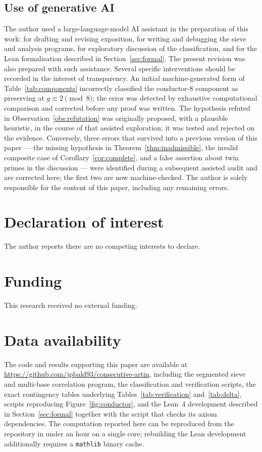 \documentclass[11pt,reqno]{amsart}
\theoremstyle{plain}
\theoremstyle{definition}
\begin{document}
\subsection*{Use of generative AI}
The author used a large-language-model AI assistant in the preparation of this
work: for drafting and revising exposition, for writing and debugging the
sieve and analysis programs, for exploratory discussion of the
classification, and for the Lean formalisation described in
Section~\ref{sec:formal}. The present revision was also prepared with such
assistance. Several specific interventions should be recorded in the interest
of transparency. An initial machine-generated form of
Table~\ref{tab:components} incorrectly classified the conductor-$8$ component
as preserving at $g \equiv 2 \pmod 8$; the error was detected by exhaustive
computational comparison and corrected before any proof was written. The
hypothesis refuted in Observation~\ref{obs:refutation} was originally
proposed, with a plausible heuristic, in the course of that assisted
exploration; it was tested and rejected on the evidence. Conversely, three
errors that survived into a previous version of this paper --- the missing
hypothesis in Theorem~\ref{thm:inadmissible}, the invalid composite case of
Corollary~\ref{cor:complete}, and a false assertion about twin primes in the
discussion --- were identified during a subsequent assisted audit and are
corrected here; the first two are now machine-checked. The author is solely
responsible for the content of this paper, including any remaining errors.

\section*{Declaration of interest}
The author reports there are no competing interests to declare.

\section*{Funding}
This research received no external funding.

\section*{Data availability}
The code and results supporting this paper are available at
\url{https://github.com/jpbald93/consecutive-artin}, including the segmented
sieve and multi-base correlation program, the classification and verification
scripts, the exact contingency tables underlying
Tables~\ref{tab:verification} and~\ref{tab:delta}, scripts reproducing
Figure~\ref{fig:conductor}, and the Lean~4 development described in
Section~\ref{sec:formal} together with the script that checks its axiom
dependencies. The computation reported here can be reproduced from the
repository in under an hour on a single core; rebuilding the Lean development
additionally requires a \texttt{mathlib} binary cache.
\end{document}
